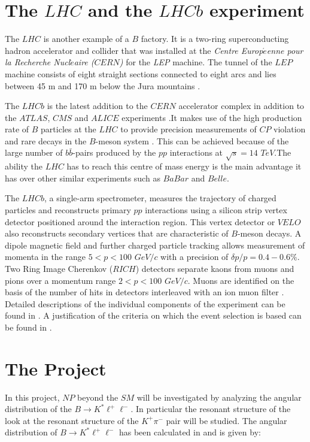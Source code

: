 \documentclass[a4paper,12pt]{article}
\begin{document}
 

\section{The $LHC$ and the $LHCb$ experiment}
The $LHC$  is another example of a $B$ factory. It is a two-ring superconducting hadron accelerator and collider that was installed at the {\it Centre Europ$\acute{e}$enne pour la  Recherche Nucl$ \acute{e}$aire ($CERN$)} for the {\it LEP} machine. The tunnel of the $LEP$ machine consists of eight straight sections connected to eight arcs and lies between 45 m and 170 m below the Jura mountains \cite{paper10}. 

The $LHCb$ is the latest addition to the $CERN$ accelerator complex  \cite[p. 30]{paper1} in addition to the $ATLAS$, $CMS$ and $ALICE$ experiments  \cite{paper17, paper18, paper19}.It makes use of the high production rate of $B$ particles at the $LHC$ to provide precision measurements of $CP$ violation and rare decays in the $B$-meson system \cite{paper13,paper14}. This can be achieved because of the large number of $b$$\bar{b}$-pairs produced by the $pp$ interactions at $\sqrt{s}=14$  $TeV$.The ability the $LHC$ has to reach this centre of mass energy is the main advantage it has over other similar experiments such as $BaBar$ and $Belle$. 

The $LHCb$, a single-arm spectrometer, measures the trajectory of charged particles and reconstructs primary $pp$ interactions using a silicon strip vertex detector positioned around the interaction region. This vertex detector or $VELO$ also reconstructs secondary vertices that are characteristic of $B$-meson decays. A dipole magnetic field and further charged particle tracking allows measurement of momenta in the range $5 < p < 100$ $GeV/c$ with a precision of $\delta p/p = 0.4-0.6\%$. Two Ring Image Cherenkov ($RICH$) detectors separate kaons from muons and pions over a momentum range $2 < p < 100$ $GeV/c$. Muons are identified on the basis of the number of hits in detectors interleaved with an ion muon filter \cite{paper40}. Detailed descriptions of the individual components of the experiment can be found in \cite{paper12, paper13, paper14, paper16}. A justification of the criteria on which the event selection is based can be found in \cite{1}. 

\section{The Project }
In this project, $NP$ beyond the $SM$ will be investigated by analyzing the angular distribution of the $B \to K^{*} \ell^{+} \ell^{-}$. In particular the resonant structure of the look at the resonant
structure of the $K^+\pi^-$ pair will be studied. The angular distribution of $B \to K^{*} \ell^{+} \ell^{-}$ has been calculated in \cite{paper3} and is given by:
\end{document}
